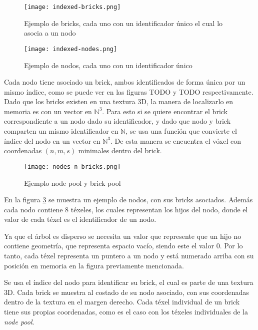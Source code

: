 \begin{figure}[h!]
    \centering
    \texttt{[image: indexed-bricks.png]}
    \caption{Ejemplo de bricks, cada uno con un identificador único el cual lo asocia a un nodo}
    \label{fig:indexed_bricks}
\end{figure}

\begin{figure}[h!]
    \centering
    \texttt{[image: indexed-nodes.png]}
    \caption{Ejemplo de nodos, cada uno con un identificador único}
    \label{fig:indexed_nodes}
\end{figure}

Cada nodo tiene asociado un brick, ambos identificados de forma única por un mismo índice, como se puede ver en las figuras TODO y TODO respectivamente.
Dado que los bricks existen en una textura 3D, la manera de localizarlo en memoria es con un vector en $\mathbb{N}^3$.
Para esto si se quiere encontrar el brick correspondiente a un nodo dado su identificador, y dado que nodo y brick comparten un mismo identificador en $\mathbb{N}$, se usa una función que convierte el índice del nodo en un vector en $\mathbb{N}^3$.
De esta manera se encuentra el vóxel con coordenadas $(n, m, s)$ minimales dentro del brick.

\begin{figure}[h!]
    \centering
    \texttt{[image: nodes-n-bricks.png]}
    \caption{Ejemplo node pool y brick pool}
    \label{fig:nodes_n_bricks}
\end{figure}

En la figura \ref{fig:nodes_n_bricks} se muestra un ejemplo de nodos, con sus bricks asociados.
Además cada nodo contiene $8$ téxeles, los cuales representan los hijos del nodo, donde el valor de cada téxel es el identificador de un nodo.

Ya que el árbol es disperso se necesita un valor que represente que un hijo no contiene geometría, que representa espacio vacío, siendo este el valor 0.
Por lo tanto, cada téxel representa un puntero a un nodo y está numerado arriba con su posición en memoria en la figura previamente mencionada.

Se usa el índice del nodo para identificar su brick, el cual es parte de una textura 3D.
Cada brick se muestra al costado de su nodo asociado, con sus coordenadas dentro de la textura en el margen derecho.
Cada téxel individual de un brick tiene sus propias coordenadas, como es el caso con los téxeles individuales de la \textit{node pool}.

